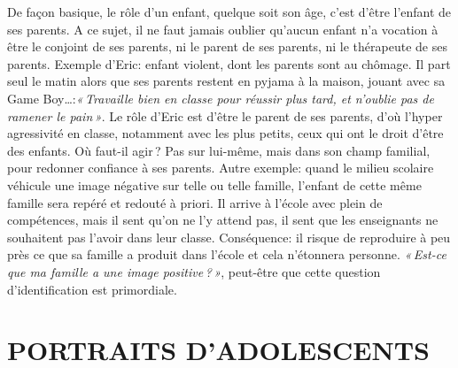 \documentclass[11pt]{article} %
\begin{document}
  De façon basique, le rôle d'un enfant, quelque soit son âge, c'est d'être l'enfant de ses parents. A ce sujet, il ne faut jamais oublier qu'aucun enfant n'a vocation à être le conjoint de ses parents, ni le parent de ses parents, ni le thérapeute de ses parents.\newline
  Exemple d'Eric: enfant violent, dont les parents sont au chômage. Il part seul le matin alors que ses parents restent en pyjama à la maison, jouant avec sa Game Boy\dots:\textit{« Travaille bien en classe pour réussir plus tard, et n'oublie pas de ramener le pain »}. Le rôle d'Eric est d'être le parent de ses parents, d'où l'hyper agressivité en classe, notamment avec les plus petits, ceux qui ont le droit d'être des enfants.\newline
  Où faut-il agir ? Pas sur lui-même, mais dans son champ familial, pour redonner confiance à ses parents.\newline
  Autre exemple: quand le milieu scolaire véhicule une image négative sur telle ou telle famille, l'enfant de cette même famille sera repéré et redouté à priori. Il arrive à l'école avec plein de compétences, mais il sent qu'on ne l'y attend pas, il sent que les enseignants ne souhaitent pas l'avoir dans leur classe. Conséquence: il risque de reproduire à peu près ce que sa famille a produit dans l'école et cela n'étonnera personne. \textit{« Est-ce que ma famille a une image positive ? »}, peut-être que cette question d'identification est primordiale.


\section{PORTRAITS D'ADOLESCENTS}
\end{document}
